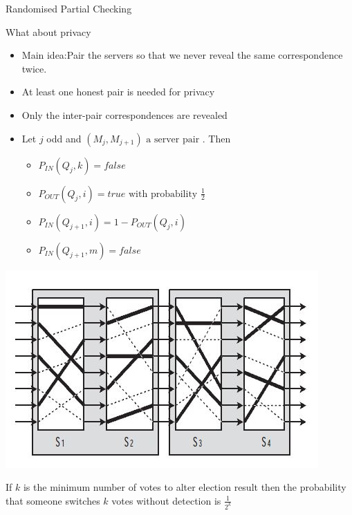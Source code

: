 \documentclass{beamer}
\begin{document}
\begin{frame}[allowframebreaks]{Randomised Partial Checking}
\begin{block}{What about privacy}
\begin{itemize}
\item Main idea:Pair the servers so that we never reveal the same correspondence twice.
\item At least one honest pair is needed for privacy
\item Only the inter-pair correspondences are revealed
\item Let $j$ odd and $(M_j,M_{j+1}) \text{ a server pair }$. Then
\begin{itemize}
\item $P_{IN}(Q_j,k)=false$
\item $P_{OUT}(Q_j,i)=true \text{ with probability } \frac{1}{2}$
\item $P_{IN}(Q_{j+1},i)=1-P_{OUT}(Q_j,i)$
\item $P_{IN}(Q_{j+1},m)=false$
\end{itemize}
\end{itemize}
\end{block}

\begin{center}
\includegraphics[scale=0.5]{rpc.jpg}
\end{center}

If $k$ is the minimum number of votes to alter election result then the probability  that someone switches $k$ votes without detection is $  \frac{1}{2^k}$
 

\end{frame}
\end{document}
